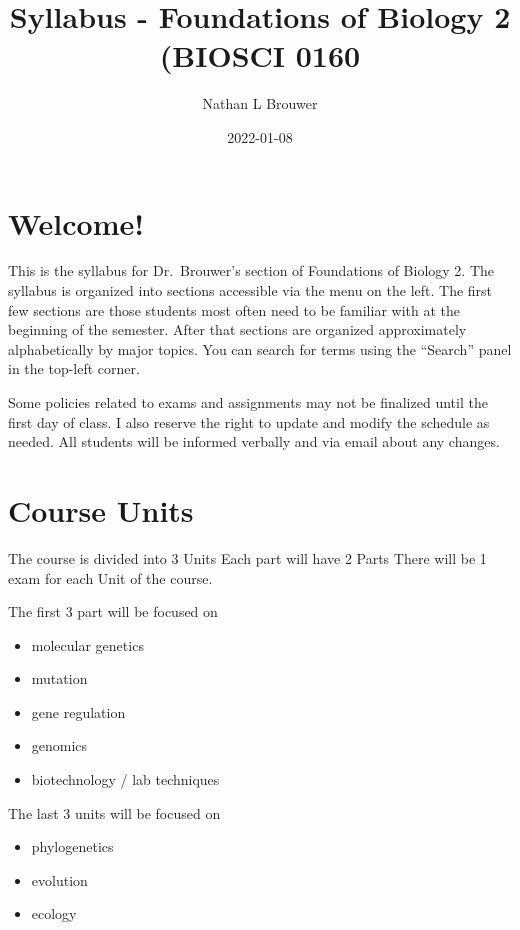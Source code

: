 \documentclass[
]{book}
\title{Syllabus - Foundations of Biology 2 (BIOSCI 0160}
\author{Nathan L Brouwer}
\date{2022-01-08}
\providecommand{\tightlist}{%
  \setlength{\itemsep}{0pt}\setlength{\parskip}{0pt}}
\begin{document}
\maketitle

{
\setcounter{tocdepth}{1}
\tableofcontents
}
\hypertarget{welcome}{%
\chapter{Welcome!}\label{welcome}}

This is the syllabus for Dr.~Brouwer's section of Foundations of Biology 2. The syllabus is organized into sections accessible via the menu on the left. The first few sections are those students most often need to be familiar with at the beginning of the semester. After that sections are organized approximately alphabetically by major topics. You can search for terms using the ``Search'' panel in the top-left corner.

Some policies related to exams and assignments may not be finalized until the first day of class. I also reserve the right to update and modify the schedule as needed. All students will be informed verbally and via email about any changes.

\hypertarget{course-units}{%
\chapter{Course Units}\label{course-units}}

The course is divided into 3 Units Each part will have 2 Parts
There will be 1 exam for each Unit of the course.

The first 3 part will be focused on

\begin{itemize}
\tightlist
\item
  molecular genetics
\item
  mutation
\item
  gene regulation
\item
  genomics
\item
  biotechnology / lab techniques
\end{itemize}

The last 3 units will be focused on

\begin{itemize}
\tightlist
\item
  phylogenetics
\item
  evolution
\item
  ecology
\end{itemize}
\end{document}

